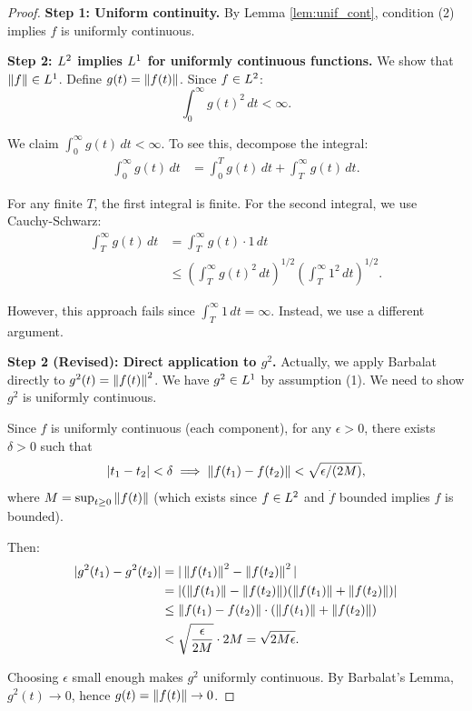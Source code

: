 \begin{proof}
\textbf{Step 1: Uniform continuity.}
By Lemma \ref{lem:unif_cont}, condition (2) implies $f$ is uniformly continuous.

\textbf{Step 2: $L^{2}$ implies $L^{1}$ for uniformly continuous functions.}
We show that $\left\| f \right\| \in L^{1}$. Define $g(t) = \left\| f(t) \right\|$. Since $f \in L^{2}$:
\begin{equation}
    \int_0^\infty g(t)^2 \, dt < \infty.
\end{equation}

We claim $\int_0^\infty g(t) \, dt < \infty$. To see this, decompose the integral:
\begin{align}
    \int_0^\infty g(t) \, dt &= \int_0^T g(t) \, dt + \int_T^\infty g(t) \, dt.
\end{align}

For any finite $T$, the first integral is finite. For the second integral, we use Cauchy-Schwarz:
\begin{align}
    \int_T^\infty g(t) \, dt &= \int_T^\infty g(t) \cdot 1 \, dt \\
    &\leq \left( \int_T^\infty g(t)^2 \, dt \right)^{1/2} \left( \int_T^\infty 1^2 \, dt \right)^{1/2}.
\end{align}

However, this approach fails since $\int_T^\infty 1 \, dt = \infty$. Instead, we use a different argument.

\textbf{Step 2 (Revised): Direct application to $g^2$.}
Actually, we apply Barbalat directly to $g^2(t) = \left\| f(t) \right\|^2$. We have $g^2 \in L^{1}$ by assumption (1). We need to show $g^2$ is uniformly continuous.

Since $f$ is uniformly continuous (each component), for any $\epsilon > 0$, there exists $\delta > 0$ such that
\begin{equation}
    |t_1 - t_2| < \delta \implies \left\| f(t_1) - f(t_2) \right\| < \sqrt{\epsilon/(2M)},
\end{equation}
where $M = \sup_{t \geq 0} \left\| f(t) \right\|$ (which exists since $f \in L^{2}$ and $\dot{f}$ bounded implies $f$ is bounded).

Then:
\begin{align}
    |g^2(t_1) - g^2(t_2)| &= |\left\| f(t_1) \right\|^2 - \left\| f(t_2) \right\|^2| \\
    &= |(\left\| f(t_1) \right\| - \left\| f(t_2) \right\|)(\left\| f(t_1) \right\| + \left\| f(t_2) \right\|)| \\
    &\leq \left\| f(t_1) - f(t_2) \right\| \cdot (\left\| f(t_1) \right\| + \left\| f(t_2) \right\|) \\
    &< \sqrt{\frac{\epsilon}{2M}} \cdot 2M = \sqrt{2M\epsilon}.
\end{align}

Choosing $\epsilon$ small enough makes $g^2$ uniformly continuous. By Barbalat's Lemma, $g^2(t) \to 0$, hence $g(t) = \left\| f(t) \right\| \to 0$.
\end{proof}

